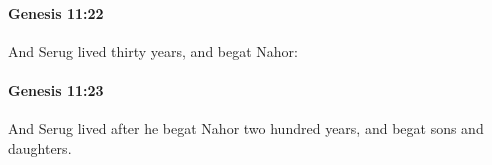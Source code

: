 		\paragraph{Genesis 11:22} %
			\label{GENESIS-11-22}

			And Serug lived thirty years, and begat Nahor:


		\paragraph{Genesis 11:23} %
			\label{GENESIS-11-23}

			And Serug lived after he begat Nahor two hundred years, and begat sons and daughters.


